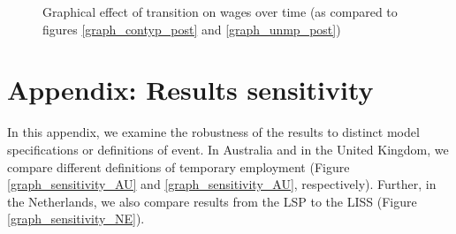 
\begin{figure}
    \caption{Graphical effect of transition on wages over time (as compared to figures \ref{graph_contyp_post} and  \ref{graph_unmp_post})}
    \label{graph_sensitivity_post_censoring}
\end{figure}


\clearpage
\section{Appendix: Results sensitivity}\label{appendix:sensitivity_variable}
\setcounter{table}{0}
\setcounter{figure}{0}
\renewcommand*\thetable{\Alph{section}.\arabic{table}}
\renewcommand*\thefigure{\Alph{section}.\arabic{figure}}
\renewcommand{\theHfigure}{\Alph{section}.\arabic{table}}
\renewcommand{\theHtable}{\Alph{section}.\arabic{figure}}

In this appendix, we examine the robustness of the results to distinct model specifications or definitions of event.  In Australia and in the United Kingdom, we compare different definitions of temporary employment (Figure \ref{graph_sensitivity_AU} and \ref{graph_sensitivity_AU}, respectively).  Further, in the Netherlands, we also compare results from the LSP to the LISS (Figure \ref{graph_sensitivity_NE}).  



